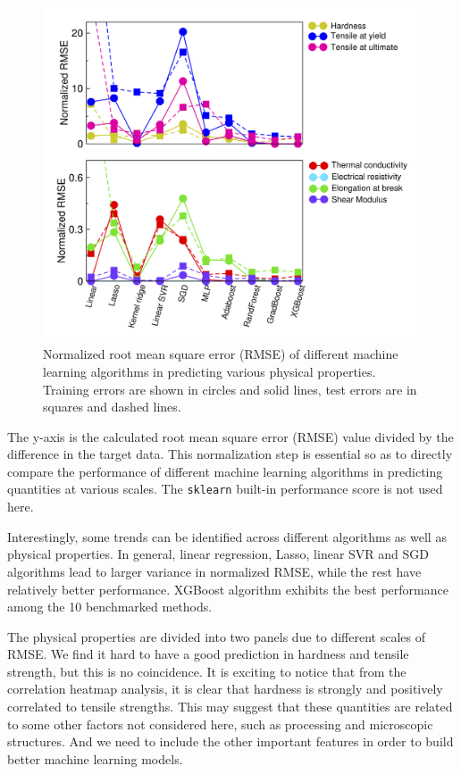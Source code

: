 \documentclass[10pt,aps,prb,amsmath,amssymb,twocolumn,letterpaper,nobalancelastpage,final,citeautoscript,floatfix,raggedbottom,superscriptaddress]{revtex4-1}
\begin{document}
\begin{figure}[h]
  \center
 \includegraphics[width=0.95\linewidth]{figures/benchmark.png}
 \vspace{-10pt}
  \caption{Normalized root mean square error (RMSE) of different machine learning algorithms in predicting various physical properties. Training errors are shown in circles and solid lines, test errors are in squares and dashed lines.}
  \label{fig:benchmark}
\end{figure}


The y-axis is the calculated root mean square error (RMSE) value divided by the difference in the target data. This normalization step is essential so as to directly compare the performance of different machine learning algorithms in predicting quantities at various scales. The \texttt{sklearn} built-in performance score is not used here.

Interestingly, some trends can be identified across different algorithms as well as physical properties. In general, linear regression, Lasso, linear SVR and SGD algorithms lead to larger variance in normalized RMSE, while the rest have relatively better performance. XGBoost algorithm exhibits the best performance among the 10 benchmarked methods.

The physical properties are divided into two panels due to different scales of RMSE. We find it hard to have a good prediction in hardness and tensile strength, but this is no coincidence. It is exciting to notice that from the correlation heatmap analysis, it is clear that hardness is strongly and positively correlated to tensile strengths. This may suggest that these quantities are related to some other factors not considered here, such as processing and microscopic structures. And we need to include the other important features in order to build better machine learning models.
\end{document}
